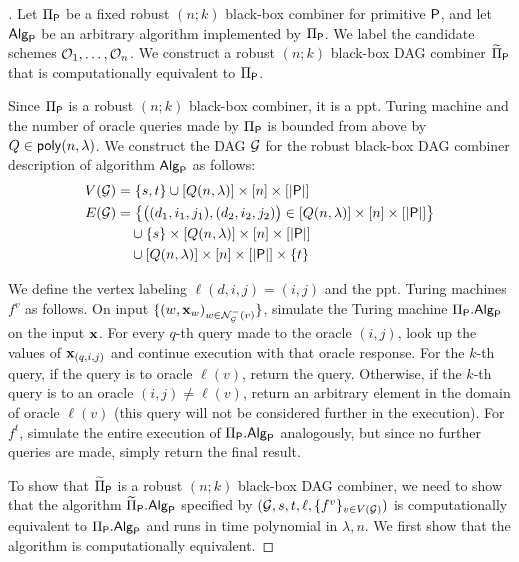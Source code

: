 \begin{proof}[]
	Let $\BBComb{P}$ be a fixed robust $(n;k)$ black-box combiner for primitive $\prim{P}$,
	and let $\alg{Alg}{P}$ be an arbitrary algorithm implemented by $\BBComb{P}$.
	We label the candidate schemes $\O_1, \ldots, \O_n$.
	We construct a robust $(n;k)$ black-box DAG combiner $\DAGComb{P}$ that is computationally equivalent to $\BBComb{P}$.

	Since $\BBComb{P}$ is a robust $(n;k)$ black-box combiner, it is a ppt. Turing machine and the number of oracle queries made by 
	$\BBComb{P}$ is bounded from above by $Q \in \poly[n,\lambda]$. 
	We construct the DAG $\G$ for the robust black-box DAG combiner description of algorithm $\alg{Alg}{P}$ as follows:
	\begin{align}
		V(\G) &= \Brace*{s,t} \cup [Q(n,\lambda)] \times [n] \times [|\prim{P}|]\\ 
		E(\G) &= \Brace*{\bigl((d_1, i_1, j_1), (d_2, i_2, j_2)\bigr) \in [Q(n,\lambda)] \times [n] \times [|\prim{P}|]}\\ 
		&\quad \cup \{s\} \times [Q(n,\lambda)] \times [n] \times [|\prim{P}|]\\ 
		&\quad \cup [Q(n,\lambda)] \times [n] \times [|\prim{P}|] \times \{t\}
	\end{align}

	We define the vertex labeling $\ell(d,i,j) = (i,j)$ and the ppt. Turing machines $f^{v}$
	as follows. On input $\{(w,\x_w)_{w \in \mathcal N^-_{\G}(v)}\}$, simulate the Turing machine $\BBComb{P}.\alg{Alg}{P}$
	on the input $\x$. For every $q$-th query made to the oracle $(i,j)$, look up the values of $\x_{(q,i,j)}$ and continue execution with that oracle response.
	For the $k$-th query, if the query is to oracle $\ell(v)$, return the query. Otherwise,
	if the $k$-th query is to an oracle $(i,j) \neq \ell(v)$, return an arbitrary element in the domain of oracle $\ell(v)$ (this query will not be considered further in the execution).
	For $f^t$, simulate the entire execution of $\BBComb{P}.\alg{Alg}{P}$ analogously, but since no further queries are made, simply return the final result.

	To show that $\DAGComb{P}$ is a robust $(n;k)$ black-box DAG combiner, we need to show that the algorithm $\DAGComb{P}.\alg{Alg}{P}$
	specified by $(\G, s, t, \ell, \{f^v\}_{v \in V(\G)})$ is computationally equivalent to $\BBComb{P}.\alg{Alg}{P}$ and runs in time polynomial in $\lambda, n$.
	We first show that the algorithm is computationally equivalent.


\end{proof}
